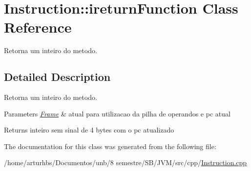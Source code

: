 \hypertarget{classInstruction_1_1ireturnFunction}{}\section{Instruction\+:\+:ireturn\+Function Class Reference}
\label{classInstruction_1_1ireturnFunction}


Retorna um inteiro do metodo.  




\subsection{Detailed Description}
Retorna um inteiro do metodo. 


\begin{DoxyParams}{Parameters}
{\em \hyperlink{classFrame}{Frame}} & atual para utilizacao da pilha de operandos e pc atual \\
\hline
\end{DoxyParams}
\begin{DoxyReturn}{Returns}
inteiro sem sinal de 4 bytes com o pc atualizado 
\end{DoxyReturn}


The documentation for this class was generated from the following file\+:\begin{DoxyCompactItemize}
\item 
/home/arturhbs/\+Documentos/unb/8 semestre/\+S\+B/\+J\+V\+M/src/cpp/\hyperlink{Instruction_8cpp}{Instruction.\+cpp}\end{DoxyCompactItemize}
